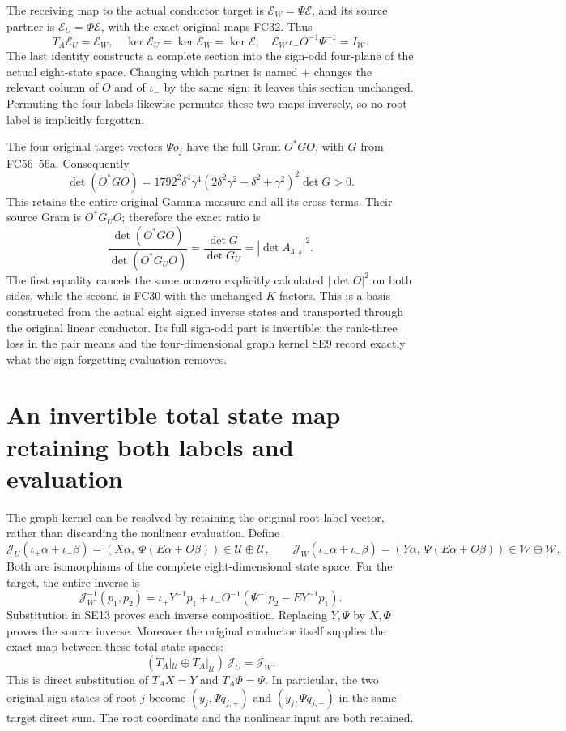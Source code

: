 The receiving map to the actual conductor target is
$\mathcal E_W=\Psi\mathcal E$, and its source partner is
$\mathcal E_U=\Phi\mathcal E$, with the exact original maps FC32.
Thus
\[
 T_A\mathcal E_U=\mathcal E_W,\quad
 \ker\mathcal E_U=\ker\mathcal E_W=\ker\mathcal E,\quad
 \mathcal E_W\,\iota_-O^{-1}\Psi^{-1}=I_{\mathcal W}.
 \tag{SE10}
\]
The last identity constructs a complete section into the sign-odd
four-plane of the actual eight-state space. Changing which partner
is named $+$ changes the relevant column of $O$ and of $\iota_-$
by the same sign; it leaves this section unchanged. Permuting the
four labels likewise permutes these two maps inversely, so no root
label is implicitly forgotten.

The four original target vectors $\Psi o_j$ have the full Gram
$O^*GO$, with $G$ from FC56--56a. Consequently
\[
 \det(O^*GO)=1792^2\delta^4\gamma^4
       (2\delta^2\gamma^2-\delta^2+\gamma^2)^2\det G>0.
 \tag{SE11}
\]
This retains the entire original Gamma measure and all its cross
terms. Their source Gram is $O^*G_UO$; therefore the exact ratio is
\[
 \frac{\det(O^*GO)}{\det(O^*G_UO)}
 =\frac{\det G}{\det G_U}=|\det A_{3,s}|^2.
 \tag{SE12}
\]
The first equality cancels the same nonzero explicitly calculated
$|\det O|^2$ on both sides, while the second is FC30 with the
unchanged $K$ factors. This is a basis constructed from the actual
eight signed inverse states and transported through the original
linear conductor. Its full sign-odd part is invertible; the rank-three
loss in the pair means and the four-dimensional graph kernel SE9
record exactly what the sign-forgetting evaluation removes.

\section{An invertible total state map retaining both labels and evaluation}
The graph kernel can be resolved by retaining the original root-label
vector, rather than discarding the nonlinear evaluation. Define
\[
 \mathcal J_U(\iota_+\alpha+\iota_-\beta)
       =(X\alpha,\ \Phi(E\alpha+O\beta))\in\mathcal U\oplus\mathcal U,
 \qquad
 \mathcal J_W(\iota_+\alpha+\iota_-\beta)
       =(Y\alpha,\ \Psi(E\alpha+O\beta))\in\mathcal W\oplus\mathcal W.
 \tag{SE13}
\]
Both are isomorphisms of the complete eight-dimensional state space.
For the target, the entire inverse is
\[
 \mathcal J_W^{-1}(p_1,p_2)=
 \iota_+Y^{-1}p_1+
 \iota_-O^{-1}(\Psi^{-1}p_2-EY^{-1}p_1).
 \tag{SE14}
\]
Substitution in SE13 proves each inverse composition. Replacing
$Y,\Psi$ by $X,\Phi$ proves the source inverse. Moreover the
original conductor itself supplies the exact map between these
total state spaces:
\[
 (T_A|_{\mathcal U}\oplus T_A|_{\mathcal U})\,\mathcal J_U
      =\mathcal J_W.
 \tag{SE15}
\]
This is direct substitution of $T_AX=Y$ and $T_A\Phi=\Psi$.
In particular, the two original sign states of root $j$ become
$(y_j,\Psi q_{j,+})$ and $(y_j,\Psi q_{j,-})$ in the same
target direct sum. The root coordinate and the nonlinear input
are both retained.


